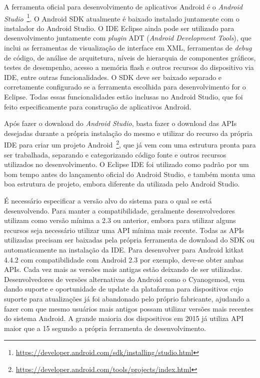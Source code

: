 \begin{apendicesenv}
A ferramenta oficial para desenvolvimento de aplicativos Android é o \textit{Android Studio}~\footnote{\url{https://developer.android.com/sdk/installing/studio.html}}. O Android SDK atualmente é baixado instalado juntamente com o instalador do Android Studio. O IDE Eclipse ainda pode ser utilizado para desenvolvimento juntamente com \textit{plugin} ADT (\textit{Android Development Tools}), que inclui as ferramentas de visualização de interface em XML, ferramentas de \textit{debug} de código, de análise de arquitetura, níveis de hierarquia de componentes gráficos, testes de desempenho, acesso a memória flash e outros recursos do dispositivo via IDE, entre outras funcionalidades.  O SDK deve ser baixado separado e corretamente configurado se a ferramenta escolhida para desenvolvimento for o Eclipse. Todas essas funcionalidades estão inclusas no Android Studio, que foi feito especificamente para construção de aplicativos Android.

Após fazer o download do \textit{Android Studio}, basta fazer o download das APIs desejadas durante a própria instalação do mesmo e utilizar do recurso da própria IDE para criar um projeto Android~\footnote{\url{https://developer.android.com/tools/projects/index.html}}, que já vem com uma estrutura pronta para ser trabalhada, separando e categorizando código fonte e outros recursos utilizados no desenvolvimento. O Eclipse IDE foi utilizado como padrão por um bom tempo antes do lançamento oficial do Android Studio, e também monta uma boa estrutura de projeto, embora diferente da utilizada pelo Android Studio.

É necessário especificar a versão alvo do sistema para o qual se está desenvolvendo. Para manter a compatibilidade, geralmente desenvolvedores utilizam como versão mínima a 2.3 ou anterior, embora para utilizar alguns recursos seja necessário utilizar uma API mínima mais recente. Todas as APIs utilizadas precisam ser baixadas pela própria ferramenta de download do SDK ou automaticamente na instalação da IDE. Para desenvolver para Android kitkat 4.4.2 com compatibilidade com Android 2.3 por exemplo, deve-se obter ambas APIs. Cada vez mais as versões mais antigas estão deixando de ser utilizadas. Desenvolvedores de versões alternativas do Android como o Cyanogemod, vem dando suporte e oportunidade de update da plataforma para dispositivos cujo suporte para atualizações já foi abandonado pelo próprio fabricante, ajudando a fazer com que mesmo usuários mais antigos possam utilizar versões mais recentes do sistema Android. A grande maioria dos dispositivos em 2015 já utiliza API maior que a 15 segundo a própria ferramenta de desenvolvimento.


\end{apendicesenv}

